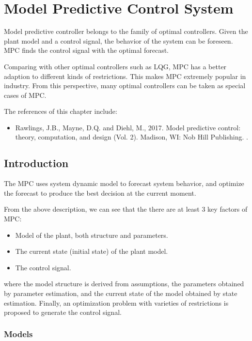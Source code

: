 \chapter{Model Predictive Control System} \label{ch:mpcs}

Model predictive controller belongs to the family of optimal controllers. Given the plant model and a control signal, the behavior of the system can be foreseen. MPC finds the control signal with the optimal forecast.

Comparing with other optimal controllers such as LQG, MPC has a better adaption to different kinds of restrictions. This makes MPC extremely popular in industry. From this perspective, many optimal controllers can be taken as special cases of MPC.

The references of this chapter include:
\begin{itemize}
	\item Rawlings, J.B., Mayne, D.Q. and Diehl, M., 2017. Model predictive control: theory, computation, and design (Vol. 2). Madison, WI: Nob Hill Publishing. \cite{rawlings2017model}.
\end{itemize}

\section{Introduction}

The MPC uses system dynamic model to forecast system behavior, and optimize the forecast to produce the best decision at the current moment.

From the above description, we can see that the there are at least 3 key factors of MPC:
\begin{itemize}
	\item Model of the plant, both structure and parameters.
	\item The current state (initial state) of the plant model.
	\item The control signal.
\end{itemize}
where the model structure is derived from assumptions, the parameters obtained by parameter estimation, and the current state of the model obtained by state estimation. Finally, an optimization problem with varieties of restrictions is proposed to generate the control signal.

\subsection{Models}

